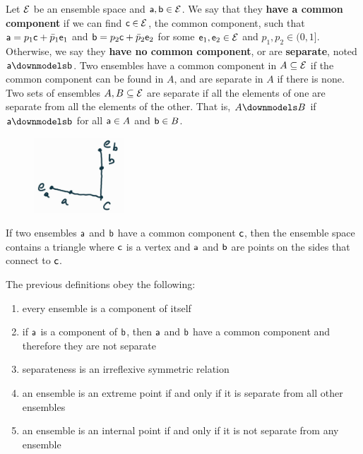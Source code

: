 \begin{mathSection}
\begin{defn}
	Let $\Ens$ be an ensemble space and $\ens[a], \ens[b] \in \Ens$. We say that they \textbf{have a common component} if we can find $\ens[c] \in \Ens$, the common component, such that $\ens[a] = p_1 \ens[c] + \bar{p}_1 \ens_1$ and $\ens[b] = p_2 \ens[c] + \bar{p}_2 \ens_2$ for some $\ens_1, \ens_2 \in \Ens$ and $p_1, p_2 \in (0,1]$. Otherwise, we say they \textbf{have no common component}, or are \textbf{separate}, noted $\ens[a] \separate \ens[b]$. Two ensembles have a common component in $A \subseteq \Ens$ if the common component can be found in $A$, and are separate in $A$ if there is none. Two sets of ensembles $A, B \subseteq \Ens$ are separate if all the elements of one are separate from all the elements of the other. That is, $A \separate B$ if $\ens[a] \separate \ens[b]$ for all $\ens[a] \in A$ and $\ens[b] \in B$.
\end{defn}

\begin{figure}[H]
	\centering
	\includegraphics[width=0.3\textwidth]{tempimages/CommonComponent.jpg}
\end{figure}

\begin{remark}
	If two ensembles $\ens[a]$ and $\ens[b]$ have a common component $\ens[c]$, then the ensemble space contains a triangle where $\ens[c]$ is a vertex and $\ens[a]$ and $\ens[b]$ are points on the sides that connect to $\ens[c]$.
\end{remark}

\begin{coro}
	The previous definitions obey the following:
	\begin{enumerate}
		\item every ensemble is a component of itself
		\item if $\ens[a]$ is a component of $\ens[b]$, then $\ens[a]$ and $\ens[b]$ have a common component and therefore they are not separate
		\item separateness is an irreflexive symmetric relation
		\item an ensemble is an extreme point if and only if it is separate from all other ensembles
		\item an ensemble is an internal point if and only if it is not separate from any ensemble
	\end{enumerate}
\end{coro}


\end{mathSection}
